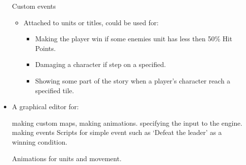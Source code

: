 \begin{itemize}
	\cross Custom events
	\begin{itemize}
		\item Attached to units or titles, could be used for:
		\begin{itemize}
			\item Making the player win if some enemies unit has less then 50\% Hit Points.
			
			\item Damaging a character if step on a specified.
			
			\item Showing some part of the story when a player's character reach a specified tile.
		\end{itemize}
	\end{itemize}
	
	\item A graphical editor for:
	\begin{itemize}
		\tick   making custom maps,
		\tick   making animations.
		\cross  specifying the input to the engine.
		\cross  making events
		\cross  Scripts for simple event such as `Defeat the leader' as a winning condition.
	\end{itemize}
	
	\tick Animations for units and movement.
\end{itemize}